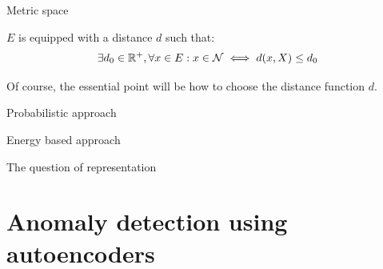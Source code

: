 \documentclass[xcolor=pdftex,dvipsnames,table,mathserif]{beamer}
\begin{document}
\begin{frame}{Metric space}

  $E$ is equipped with a distance $d$ such that:
  \[
  \exists d_0 \in \mathbb{R}^+,  \forall x \in E: x \in \mathcal{N} \iff d(x, X) \leq d_0
  \]

  Of course, the essential point will be how to choose the distance function $d$.

\end{frame}


\begin{frame}{Probabilistic approach}




\end{frame}



\begin{frame}{Energy based approach}

\end{frame}


\begin{frame}{The question of representation}

\end{frame}


\section{Anomaly detection using autoencoders}
\end{document}
